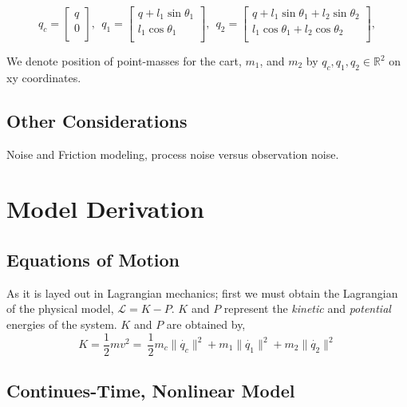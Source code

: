 \documentclass[journal]{IEEEtran}
\begin{document}
\begin{equation*}
q_c = \begin{bmatrix}
    q \\
    0 \\
\end{bmatrix}, ~~
q_1 = \begin{bmatrix}
    q + l_1 \sin \theta_1 \\
    l_1 \cos \theta_1 \\
\end{bmatrix}, ~~
q_2 = \begin{bmatrix}
    q + l_1 \sin \theta_1 + l_2 \sin \theta_2 \\
    l_1 \cos \theta_1 + l_2 \cos \theta_2 \\
\end{bmatrix},
\end{equation*}

\noindent
We denote position of point-masses for the cart, \(m_1\), and
 \(m_2\) by \(q_c, q_1, q_2 \in \mathbb{R}^2\) on xy coordinates.

\subsection{Other Considerations}
Noise and Friction modeling, process noise versus observation noise.

\section{Model Derivation}



\subsection{Equations of Motion}
As it is layed out in Lagrangian mechanics; first we must obtain the Lagrangian
of the physical model, \(\mathcal{L}= K -P\). \(K\) and \(P\) represent the
\emph{kinetic} and \emph{potential} energies of the system. \(K\) and \(P\) are
obtained by,
\begin{equation}
    K = \frac{1}{2} m v^2 =~ \frac{1}{2} {m_c\|\dot{q_c}\|^2 + m_1\|\dot{q_1}\|^2 + m_2\|\dot{q_2}\|^2}
\end{equation}

\subsection{Continues-Time, Nonlinear Model}
\end{document}
